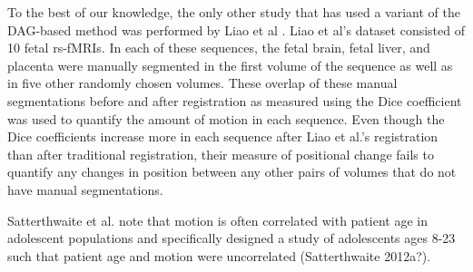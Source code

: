 To the best of our knowledge, the only other study that has used a variant of the DAG-based method was performed by Liao et al \cite{Liao2016}. Liao et al’s dataset consisted of 10 fetal rs-fMRIs. In each of these sequences, the fetal brain, fetal liver, and placenta were manually segmented in the first volume of the sequence as well as in five other randomly chosen volumes. These overlap of these manual segmentations before and after registration as measured using the Dice coefficient was used to quantify the amount of motion in each sequence. Even though the Dice coefficients increase more in each sequence after Liao et al.’s registration than after traditional registration, their measure of positional change fails to quantify any changes in position between any other pairs of volumes that do not have manual segmentations. 

Satterthwaite et al. note that motion is often correlated with patient age in adolescent populations and specifically designed a study of adolescents ages 8-23 such that patient age and motion were uncorrelated (Satterthwaite 2012a?).